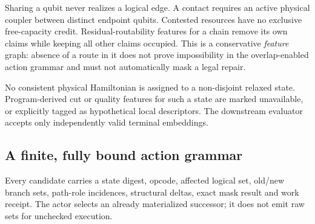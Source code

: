 \documentclass[11pt,a4paper]{article}
\theoremstyle{definition}\newtheorem{definition}[proposition]{Definition}
\begin{document}
Sharing a qubit never realizes a logical edge. A contact requires an active physical coupler between distinct endpoint qubits. Contested resources have no exclusive free-capacity credit. Residual-routability features for a chain remove its own claims while keeping all other claims occupied. This is a conservative \emph{feature} graph: absence of a route in it does not prove impossibility in the overlap-enabled action grammar and must not automatically mask a legal repair.

No consistent physical Hamiltonian is assigned to a non-disjoint relaxed state. Program-derived cut or quality features for such a state are marked unavailable, or explicitly tagged as hypothetical local descriptors. The downstream evaluator accepts only independently valid terminal embeddings.

\subsection{A finite, fully bound action grammar}
Every candidate carries a state digest, opcode, affected logical set, old/new branch sets, path-role incidences, structural deltas, exact mask result and work receipt. The actor selects an already materialized successor; it does not emit raw sets for unchecked execution.
\end{document}
